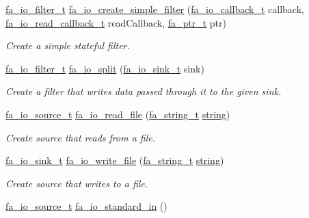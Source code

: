 \begin{DoxyCompactItemize}
\hyperlink{group___fa_io_ga3e1f11810efcba3b45842e10c1425aba}{fa\-\_\-io\-\_\-filter\-\_\-t} \hyperlink{group___fa_io_ga0f2da1ffcf02190f82e3b20583b2c340}{fa\-\_\-io\-\_\-create\-\_\-simple\-\_\-filter} (\hyperlink{group___fa_io_gaa151f2c484756349795513fdf67a0268}{fa\-\_\-io\-\_\-callback\-\_\-t} callback, \hyperlink{group___fa_io_gabadf768f91c382d0700638f384f48416}{fa\-\_\-io\-\_\-read\-\_\-callback\-\_\-t} read\-Callback, \hyperlink{group___fa_ga915ddeae99ad7568b273d2b876425197}{fa\-\_\-ptr\-\_\-t} ptr)
\begin{DoxyCompactList}\small\item\em Create a simple stateful filter. \end{DoxyCompactList}\item 
\hyperlink{group___fa_io_ga3e1f11810efcba3b45842e10c1425aba}{fa\-\_\-io\-\_\-filter\-\_\-t} \hyperlink{group___fa_io_ga2c8a8774e54c943b9972c18333971978}{fa\-\_\-io\-\_\-split} (\hyperlink{group___fa_io_ga0d00d1e2c742abdba97597662815ce3a}{fa\-\_\-io\-\_\-sink\-\_\-t} sink)
\begin{DoxyCompactList}\small\item\em Create a filter that writes data passed through it to the given sink. \end{DoxyCompactList}\item 
\hyperlink{group___fa_io_ga95a53a87c83414434e1afd3097b96ea4}{fa\-\_\-io\-\_\-source\-\_\-t} \hyperlink{group___fa_io_ga2d7dd21d610308d507d2471236e426b5}{fa\-\_\-io\-\_\-read\-\_\-file} (\hyperlink{group___fa_string_gacada63033b77bc6c39fa632ae199349b}{fa\-\_\-string\-\_\-t} \hyperlink{util_8h_a41106000aac73b61e4fc2ef9dd39a603}{string})
\begin{DoxyCompactList}\small\item\em Create source that reads from a file. \end{DoxyCompactList}\item 
\hyperlink{group___fa_io_ga0d00d1e2c742abdba97597662815ce3a}{fa\-\_\-io\-\_\-sink\-\_\-t} \hyperlink{group___fa_io_ga6c55c0dff1d5e8fca3ec227b66beddcb}{fa\-\_\-io\-\_\-write\-\_\-file} (\hyperlink{group___fa_string_gacada63033b77bc6c39fa632ae199349b}{fa\-\_\-string\-\_\-t} \hyperlink{util_8h_a41106000aac73b61e4fc2ef9dd39a603}{string})
\begin{DoxyCompactList}\small\item\em Create source that writes to a file. \end{DoxyCompactList}\item 
\hyperlink{group___fa_io_ga95a53a87c83414434e1afd3097b96ea4}{fa\-\_\-io\-\_\-source\-\_\-t} \hyperlink{group___fa_io_gafea99482db8d693d53d6b157960e06af}{fa\-\_\-io\-\_\-standard\-\_\-in} ()

\end{DoxyCompactItemize}
